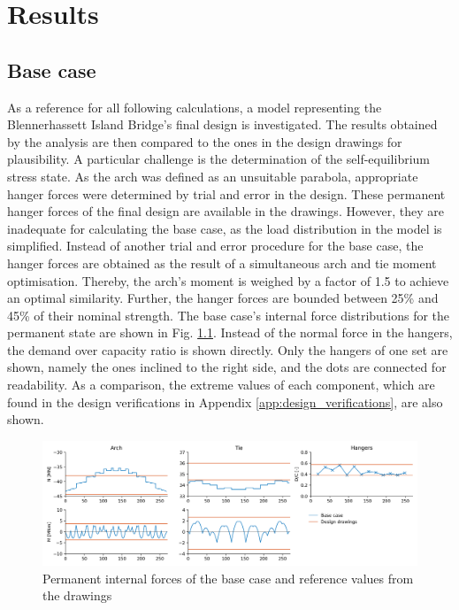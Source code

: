 \chapter{Results}\label{sec:results}

\section{Base case}
As a reference for all following calculations, a model representing the Blennerhassett Island Bridge's final design is investigated. The results obtained by the analysis are then compared to the ones in the design drawings for plausibility. A particular challenge is the determination of the self-equilibrium stress state. As the arch was defined as an unsuitable parabola, appropriate hanger forces were determined by trial and error in the design. These permanent hanger forces of the final design are available in the drawings. However, they are inadequate for calculating the base case, as the load distribution in the model is simplified. Instead of another trial and error procedure for the base case, the hanger forces are obtained as the result of a simultaneous arch and tie moment optimisation. Thereby, the arch's moment is weighed by a factor of 1.5 to achieve an optimal similarity. Further, the hanger forces are bounded between 25\% and 45\% of their nominal strength. The base case's internal force distributions for the permanent state are shown in Fig. \ref{fig:base_case_permanent}. Instead of the normal force in the hangers, the demand over capacity ratio is shown directly. Only the hangers of one set are shown, namely the ones inclined to the right side, and the dots are connected for readability. As a comparison, the extreme values of each component, which are found in the design verifications in Appendix \ref{app:design_verifications}, are also shown.

\begin{figure}[H]
    \centering
    \includegraphics[width=\textwidth]{calculations/Base case/Permanent state.png}
    \caption{Permanent internal forces of the base case and reference values from the drawings}
    \label{fig:base_case_permanent}
\end{figure}

